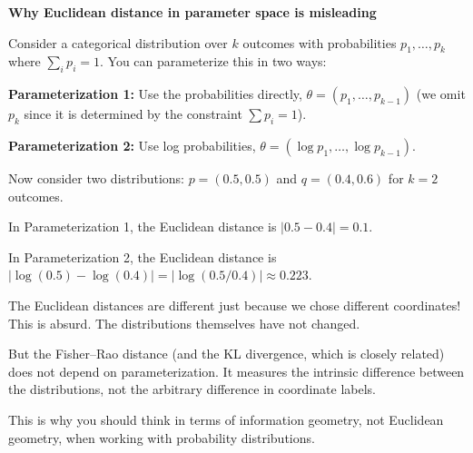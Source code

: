 \begin{examplebox}
\textbf{Why Euclidean distance in parameter space is misleading}

\vspace{0.5em}

Consider a categorical distribution over $k$ outcomes with probabilities $p_1, \ldots, p_k$ where $\sum_i p_i = 1$. You can parameterize this in two ways:

\vspace{0.5em}

\textbf{Parameterization 1:} Use the probabilities directly, $\theta = (p_1, \ldots, p_{k-1})$ (we omit $p_k$ since it is determined by the constraint $\sum p_i = 1$).

\vspace{0.5em}

\textbf{Parameterization 2:} Use log probabilities, $\theta = (\log p_1, \ldots, \log p_{k-1})$.

\vspace{0.5em}

Now consider two distributions: $p = (0.5, 0.5)$ and $q = (0.4, 0.6)$ for $k = 2$ outcomes.

\vspace{0.5em}

In Parameterization 1, the Euclidean distance is $|0.5 - 0.4| = 0.1$.

\vspace{0.5em}

In Parameterization 2, the Euclidean distance is $|\log(0.5) - \log(0.4)| = |\log(0.5/0.4)| \approx 0.223$.

\vspace{0.5em}

The Euclidean distances are different just because we chose different coordinates! This is absurd. The distributions themselves have not changed.

\vspace{0.5em}

But the Fisher--Rao distance (and the KL divergence, which is closely related) does not depend on parameterization. It measures the intrinsic difference between the distributions, not the arbitrary difference in coordinate labels.

\vspace{0.5em}

This is why you should think in terms of information geometry, not Euclidean geometry, when working with probability distributions.
\end{examplebox}

